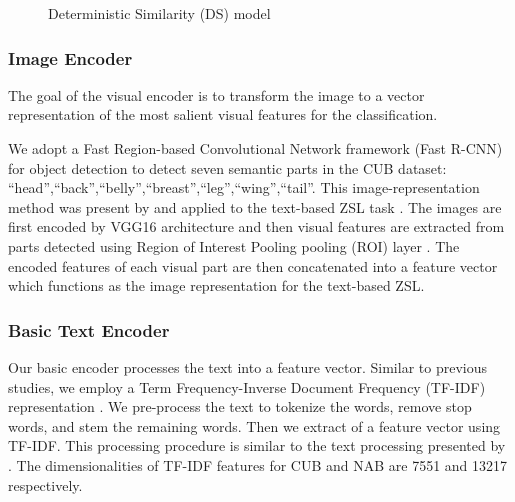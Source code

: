 \documentclass[11pt,a4paper]{article}
\begin{document}



\begin{figure}[t]
\centering
{}
 \caption{Deterministic Similarity (DS) model}
\label{fig:DS}
\end{figure}

\subsubsection{Image Encoder}
\label{section:Image_Encoder}
The goal of the visual encoder is to transform the image to a vector representation of the most salient visual features for the classification. 

We adopt a 
Fast Region-based Convolutional Network framework (Fast R-CNN) for object detection   \citep{girshick2015fast} to detect seven semantic parts in the CUB dataset:
\enquote{head},\enquote{back},\enquote{belly},\enquote{breast},\enquote{leg},\enquote{wing},\enquote{tail}. 
This image-representation method was present by \citet{zhang2016spda} and applied to the text-based ZSL task \cite{zhu2018generative,elhoseiny2017link}.
The images are first encoded by VGG16 architecture \citep{simonyan2014very} and then visual features are extracted from parts detected using Region of Interest Pooling pooling (ROI) layer \citep{girshick2015fast}. %
The encoded features of each visual part are then concatenated into a feature vector which functions as the image representation for the text-based ZSL.


\subsubsection{Basic Text Encoder}
\label{section:Text_Encoder}
Our basic encoder processes the text into a feature vector. Similar to previous studies, we employ a Term Frequency-Inverse Document Frequency (TF-IDF)  representation \citep{salton1988term}. %
We pre-process the text to tokenize the words, remove stop words, and stem the remaining words. Then we extract of a feature vector using TF-IDF. This processing procedure is similar to the text processing presented by \citet{zhu2018generative}.
The dimensionalities of TF-IDF features for CUB and NAB are 7551 and 13217 respectively. 
\end{document}
